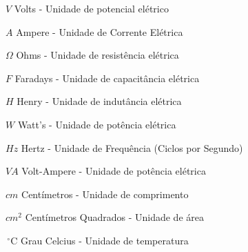 \documentclass{ifscTCC} %
\begin{document}
\begin{simbolos}
   \item[$V$] Volts - Unidade de potencial elétrico
   \item[$A$] Ampere - Unidade de Corrente Elétrica
   \item[$\Omega$] Ohms - Unidade de resistência elétrica
   \item[$F$] Faradays - Unidade de capacitância elétrica
   \item[$H$] Henry - Unidade de indutância elétrica
   \item[$W$] Watt's - Unidade de potência elétrica
   \item[$Hz$] Hertz - Unidade de Frequência (Ciclos por Segundo)
   \item[$VA$] Volt-Ampere - Unidade de potência elétrica
   \item[$cm$] Centímetros - Unidade de comprimento
   \item[$cm^{2}$] Centímetros Quadrados - Unidade de área
   \item[$\,^{\circ}\mathrm{C}$] Grau Celcius - Unidade de temperatura
\end{simbolos}

\tableofcontents*
\cleardoublepage

\textual


\end{document}
